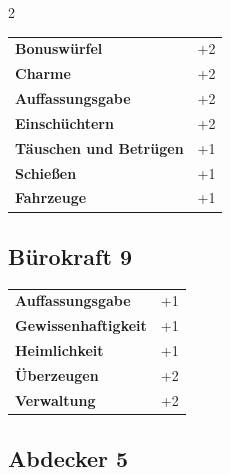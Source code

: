 \begin{multicols}{2}
\begin{tcolorbox}
\vspace{3mm}

\begin{tabular}{@{}ll@{}}
    \textbf{Bonuswürfel} & +2\\
    \textbf{Charme} & +2\\
    \textbf{Auffassungsgabe} & +2\\
    \textbf{Einschüchtern} & +2\\
    \textbf{Täuschen und Betrügen} & +1\\
    \textbf{Schießen} & +1\\
    \textbf{Fahrzeuge} & +1\\
\end{tabular}


\end{tcolorbox}

\begin{tcolorbox}
    \subsection*{Bürokraft \hfill \small{9 }}
    \tcblower




\begin{tabular}{@{}ll@{}}
    \textbf{Auffassungsgabe} & +1\\
    \textbf{Gewissenhaftigkeit} & +1\\
    \textbf{Heimlichkeit} & +1\\
    \textbf{Überzeugen} & +2\\
    \textbf{Verwaltung} & +2\\
\end{tabular}


\end{tcolorbox}

\begin{tcolorbox}
    \subsection*{Abdecker \hfill \small{5 }}
    \tcblower





\end{tcolorbox}
\end{multicols}
